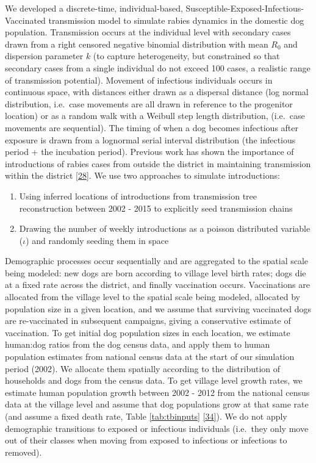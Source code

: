 \documentclass[
  oneside]{book}
\providecommand{\tightlist}{%
  \setlength{\itemsep}{0pt}\setlength{\parskip}{0pt}}
\begin{document}
We developed a discrete-time, individual-based, Susceptible-Exposed-Infectious-Vaccinated transmission model to simulate rabies dynamics in the domestic dog population. Transmission occurs at the individual level with secondary cases drawn from a right censored negative binomial distribution with mean \(R_{0}\) and dispersion parameter \(k\) (to capture heterogeneity, but constrained so that secondary cases from a single individual do not exceed 100 cases, a realistic range of transmission potential). Movement of infectious individuals occurs in continuous space, with distances either drawn as a dispersal distance (log normal distribution, i.e.~case movements are all drawn in reference to the progenitor location) or as a random walk with a Weibull step length distribution, (i.e.~case movements are sequential). The timing of when a dog becomes infectious after exposure is drawn from a lognormal serial interval distribution (the infectious period + the incubation period). Previous work has shown the importance of introductions of rabies cases from outside the district in maintaining transmission within the district \protect\hyperlink{ref-Mancyinprep}{{[}28{]}}. We use two approaches to simulate introductions:

\begin{enumerate}
\def\labelenumi{\arabic{enumi})}
\tightlist
\item
  Using inferred locations of introductions from transmission tree reconstruction between 2002 - 2015 to explicitly seed transmission chains
\item
  Drawing the number of weekly introductions as a poisson distributed variable (\(\iota\)) and randomly seeding them in space
\end{enumerate}

Demographic processes occur sequentially and are aggregated to the spatial scale being modeled: new dogs are born according to village level birth rates; dogs die at a fixed rate across the district, and finally vaccination occurs. Vaccinations are allocated from the village level to the spatial scale being modeled, allocated by population size in a given location, and we assume that surviving vaccinated dogs are re-vaccinated in subsequent campaigns, giving a conservative estimate of vaccination. To get initial dog population sizes in each location, we estimate human:dog ratios from the dog census data, and apply them to human population estimates from national census data at the start of our simulation period (2002). We allocate them spatially according to the distribution of households and dogs from the census data. To get village level growth rates, we estimate human population growth between 2002 - 2012 from the national census data at the village level and assume that dog populations grow at that same rate (and assume a fixed death rate, Table \ref{tab:tbinputs} \protect\hyperlink{ref-czupryna2016}{{[}34{]}}). We do not apply demographic transitions to exposed or infectious individuals (i.e.~they only move out of their classes when moving from exposed to infectious or infectious to removed).
\end{document}

